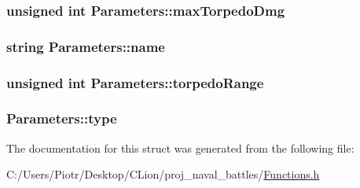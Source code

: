 \subsubsection[{\texorpdfstring{max\+Torpedo\+Dmg}{maxTorpedoDmg}}]{\setlength{\rightskip}{0pt plus 5cm}unsigned int Parameters\+::max\+Torpedo\+Dmg}\hypertarget{struct_parameters_a7c7434bba4d5209f8aa4d7c8ebcb8d64}{}\label{struct_parameters_a7c7434bba4d5209f8aa4d7c8ebcb8d64}
\subsubsection[{\texorpdfstring{name}{name}}]{\setlength{\rightskip}{0pt plus 5cm}string Parameters\+::name}\hypertarget{struct_parameters_a4b2f794128331583de50c0034c5998d2}{}\label{struct_parameters_a4b2f794128331583de50c0034c5998d2}
\subsubsection[{\texorpdfstring{torpedo\+Range}{torpedoRange}}]{\setlength{\rightskip}{0pt plus 5cm}unsigned int Parameters\+::torpedo\+Range}\hypertarget{struct_parameters_aa0d7436c6b7ab9ec385fd13c6c957e58}{}\label{struct_parameters_aa0d7436c6b7ab9ec385fd13c6c957e58}
\subsubsection[{\texorpdfstring{type}{type}}]{ Parameters\+::type}\hypertarget{struct_parameters_a44a06370c5e94b66033e8f1178b90028}{}\label{struct_parameters_a44a06370c5e94b66033e8f1178b90028}


The documentation for this struct was generated from the following file\+:\begin{DoxyCompactItemize}
\item 
C\+:/\+Users/\+Piotr/\+Desktop/\+C\+Lion/proj\+\_\+naval\+\_\+battles/\hyperlink{_functions_8h}{Functions.\+h}\end{DoxyCompactItemize}
